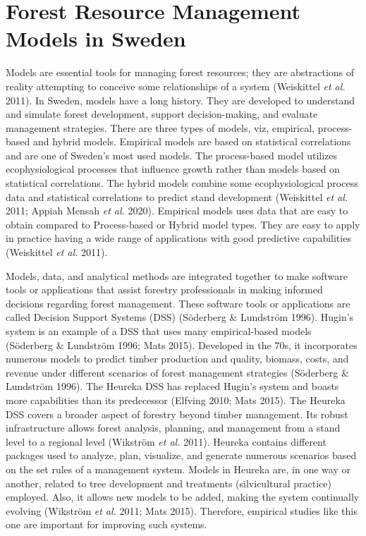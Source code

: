 \documentclass[11pt, a4paper]{report}
\begin{document}
\section{Forest Resource Management Models in Sweden}
Models are essential tools for managing forest resources; they are abstractions of reality attempting to conceive some relationships of a system (Weiskittel \textit{et al.} 2011). In Sweden, models have a long history. They are developed to understand and simulate forest development, support decision-making, and evaluate management strategies. There are three types of models, viz, empirical, process-based and hybrid models. Empirical models are based on statistical correlations and are one of Sweden's most used models. The process-based model utilizes ecophysiological processes that influence growth rather than models based on statistical correlations. The hybrid models combine some ecophysiological process data and statistical correlations to predict stand development (Weiskittel \textit{et al.} 2011; Appiah Mensah \textit{et al.} 2020). Empirical models uses data that are easy to obtain compared to Process-based or Hybrid model types. They are easy to apply in practice having a wide range of applications with good predictive capabilities (Weiskittel \textit{et al.} 2011).

Models, data, and analytical methods are integrated together to make software tools or applications that assist forestry professionals in making informed decisions regarding forest management. These software tools or applications are called Decision Support Systems (DSS) (Söderberg \& Lundström 1996). Hugin’s system is an example of a DSS that uses many empirical-based models (Söderberg \& Lundström 1996; Mats 2015). Developed in the 70s, it incorporates numerous models to predict timber production and quality, biomass, costs, and revenue under different scenarios of forest management strategies (Söderberg \& Lundström 1996). The Heureka DSS has replaced Hugin’s system and boasts more capabilities than its predecessor (Elfving 2010; Mats 2015). The Heureka DSS covers a broader aspect of forestry beyond timber management. Its robust infrastructure allows forest analysis, planning, and management from a stand level to a regional level (Wikström \textit{et al.} 2011). Heureka contains different packages used to analyze, plan, visualize, and generate numerous scenarios based on the set rules of a management system. Models in Heureka are, in one way or another, related to tree development and treatments (silvicultural practice) employed. Also, it allows new models to be added, making the system continually evolving (Wikström \textit{et al.} 2011; Mats 2015). Therefore, empirical studies like this one are important for improving such systems.
\end{document}
